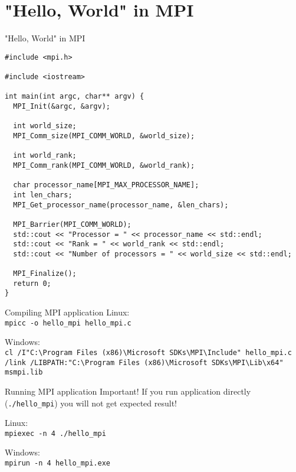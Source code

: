 \documentclass{beamer}
\begin{document}
\section{"Hello, World" in MPI}

\begin{frame}[fragile]{"Hello, World" in MPI}

  \lstset{style=CStyle, caption=Basic application written using MPI}
  \begin{lstlisting}
#include <mpi.h>

#include <iostream>

int main(int argc, char** argv) {
  MPI_Init(&argc, &argv);

  int world_size;
  MPI_Comm_size(MPI_COMM_WORLD, &world_size);

  int world_rank;
  MPI_Comm_rank(MPI_COMM_WORLD, &world_rank);

  char processor_name[MPI_MAX_PROCESSOR_NAME];
  int len_chars;
  MPI_Get_processor_name(processor_name, &len_chars);

  MPI_Barrier(MPI_COMM_WORLD);
  std::cout << "Processor = " << processor_name << std::endl;
  std::cout << "Rank = " << world_rank << std::endl;
  std::cout << "Number of processors = " << world_size << std::endl;

  MPI_Finalize();
  return 0;
}
  \end{lstlisting}

\end{frame}

\begin{frame}[fragile]{Compiling MPI application}
  Linux: \\
  \texttt{mpicc -o hello\_mpi hello\_mpi.c}

  Windows: \\
  \texttt{cl /I"C:}\texttt{\textbackslash}\texttt{Program Files (x86)}\texttt{\textbackslash}\texttt{Microsoft SDKs}\texttt{\textbackslash}\texttt{MPI}\texttt{\textbackslash}\texttt{Include" hello\_mpi.c /link /LIBPATH:"C:}\texttt{\textbackslash}\texttt{Program Files (x86)}\texttt{\textbackslash}\texttt{Microsoft SDKs}\texttt{\textbackslash}\texttt{MPI}\texttt{\textbackslash}\texttt{Lib}\texttt{\textbackslash}\texttt{x64" msmpi.lib}

\end{frame}

\begin{frame}[fragile]{Running MPI application}
  Important! If you run application directly (\texttt{./hello\_mpi}) you will not get expected result!

  Linux: \\
  \texttt{mpiexec -n 4 ./hello\_mpi}

  Windows: \\
  \texttt{mpirun -n 4 hello\_mpi.exe}
\end{frame}
\end{document}
